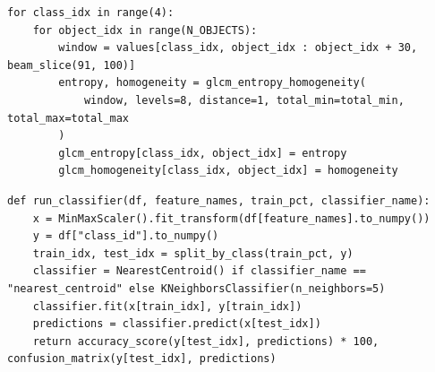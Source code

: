 \documentclass[11pt,a4paper]{article}
\begin{document}
\begin{lstlisting}[caption={Fragment własnego kodu: obliczanie entropii i spójności lokalnej GLCM.}]
for class_idx in range(4):
    for object_idx in range(N_OBJECTS):
        window = values[class_idx, object_idx : object_idx + 30, beam_slice(91, 100)]
        entropy, homogeneity = glcm_entropy_homogeneity(
            window, levels=8, distance=1, total_min=total_min, total_max=total_max
        )
        glcm_entropy[class_idx, object_idx] = entropy
        glcm_homogeneity[class_idx, object_idx] = homogeneity
\end{lstlisting}



\begin{lstlisting}[caption={Fragment własnego kodu: wspólna funkcja klasyfikacji i ewaluacji.}]
def run_classifier(df, feature_names, train_pct, classifier_name):
    x = MinMaxScaler().fit_transform(df[feature_names].to_numpy())
    y = df["class_id"].to_numpy()
    train_idx, test_idx = split_by_class(train_pct, y)
    classifier = NearestCentroid() if classifier_name == "nearest_centroid" else KNeighborsClassifier(n_neighbors=5)
    classifier.fit(x[train_idx], y[train_idx])
    predictions = classifier.predict(x[test_idx])
    return accuracy_score(y[test_idx], predictions) * 100, confusion_matrix(y[test_idx], predictions)
\end{lstlisting}
\end{document}
